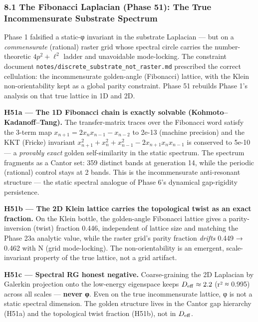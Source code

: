 \documentclass[
]{article}
\begin{document}
\subsubsection{8.1 The Fibonacci Laplacian (Phase 51): The True
Incommensurate Substrate
Spectrum}\label{the-fibonacci-laplacian-phase-51-the-true-incommensurate-substrate-spectrum}

Phase 1 falsified a static-φ invariant in the substrate Laplacian ---
but on a \emph{commensurate} (rational) raster grid whose spectral
circle carries the number-theoretic \(4p^2+\ell^2\) ladder and
unavoidable mode-locking. The constraint document
\texttt{notes/discrete\_substrate\_not\_raster.md} prescribed the
correct cellulation: the incommensurate golden-angle (Fibonacci)
lattice, with the Klein non-orientability kept as a global parity
constraint. Phase 51 rebuilds Phase 1's analysis on that true lattice in
1D and 2D.

\textbf{H51a --- The 1D Fibonacci chain is exactly solvable
(Kohmoto--Kadanoff--Tang).} The transfer-matrix traces over the
Fibonacci word satisfy the 3-term map
\(x_{n+1} = 2 x_n x_{n-1} - x_{n-2}\) to 2e-13 (machine precision) and
the KKT (Fricke) invariant
\(x_{n+1}^2+x_n^2+x_{n-1}^2-2x_{n+1}x_n x_{n-1}\) is conserved to 5e-10
--- a \emph{provably exact} golden self-similarity in the static
spectrum. The spectrum fragments as a Cantor set: 359 distinct bands at
generation 14, while the periodic (rational) control stays at 2 bands.
This is the incommensurate anti-resonant structure --- the static
spectral analogue of Phase 6's dynamical gap-rigidity persistence.

\textbf{H51b --- The 2D Klein lattice carries the topological twist as
an exact fraction.} On the Klein bottle, the golden-angle Fibonacci
lattice gives a parity-inversion (twist) fraction 0.446, independent of
lattice size and matching the Phase 23a analytic value, while the raster
grid's parity fraction \emph{drifts} 0.449 → 0.462 with N (grid
mode-locking). The non-orientability is an emergent, scale-invariant
property of the true lattice, not a grid artifact.

\textbf{H51c --- Spectral RG honest negative.} Coarse-graining the 2D
Laplacian by Galerkin projection onto the low-energy eigenspace keeps
\(D_{\rm eff} \approx 2.2\) (r² ≈ 0.995) across all scales ---
\textbf{never φ}. Even on the true incommensurate lattice, φ is not a
static spectral dimension. The golden structure lives in the Cantor gap
hierarchy (H51a) and the topological twist fraction (H51b), not in
\(D_{\rm eff}\).
\end{document}
